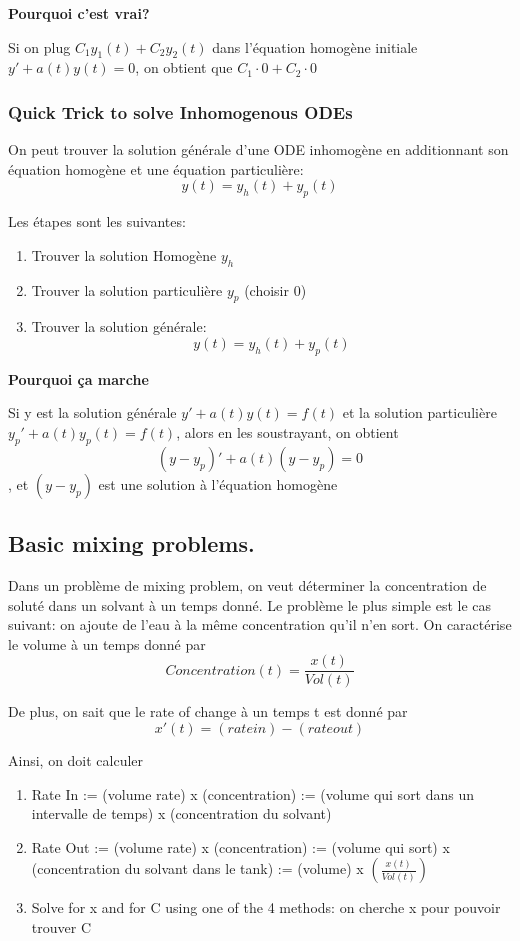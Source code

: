 \documentclass{article}
\begin{document}
\textbf{Pourquoi c'est vrai?}

Si on plug $ C_1 y_1(t) + C_2 y_2(t) $ dans l'équation homogène initiale
$y'+a(t)y(t) = 0$, on obtient que $ C_1 \cdot 0 + C_2 \cdot 0$

\subsubsection{Quick Trick to solve Inhomogenous ODEs}

On peut trouver la solution générale d'une ODE inhomogène en additionnant
son équation homogène et une équation particulière:
$$ y(t) = y_h (t) + y_p (t) $$

Les étapes sont les suivantes:
\begin{enumerate}
    \item Trouver la solution Homogène $y_h$
    \item Trouver la solution particulière $y_p$ (choisir 0)
    \item Trouver la solution générale: $$ y(t) = y_h (t) + y_p (t) $$
\end{enumerate}

\textbf{Pourquoi ça marche}

Si y est la solution générale $y'+a(t)y(t) = f(t)$ et la solution particulière
$y_p'+a(t)y_p(t) = f(t)$, alors en les soustrayant, on obtient
$$ (y-y_p)' +a(t) (y-y_p) = 0$$, et $ (y - y_p) $ est une solution à
l'équation homogène

\subsection{Basic mixing problems.}

Dans un problème de mixing problem, on veut déterminer la concentration
de soluté dans un solvant à un temps donné. Le problème le plus simple
est le cas suivant: on ajoute de l'eau à la même concentration qu'il
n'en sort. On caractérise le volume à un temps donné par
$$ Concentration(t) = \frac{x(t)}{Vol(t)} $$

De plus, on sait que le rate of change à un temps t est donné par
$$ x'(t) = (rate in) - (rate out) $$

Ainsi, on doit calculer
\begin{enumerate}
    \item Rate In := (volume rate) x (concentration) := (volume qui sort
	dans un intervalle de temps) x (concentration du solvant)
    \item Rate Out := (volume rate) x (concentration) :=
	(volume qui sort) x (concentration du solvant dans le tank) :=
	(volume) x $(\frac{x(t)}{Vol(t)} )$
    \item Solve for x and for C using one of the 4 methods: on cherche
	x pour pouvoir trouver C
\end{enumerate}
\end{document}

